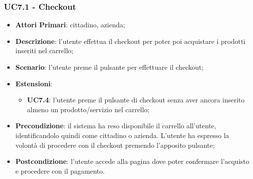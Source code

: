 \subsubsection{UC7.1 - Checkout}
\begin{itemize}
	\item \textbf{Attori Primari}: cittadino, azienda;
	\item \textbf{Descrizione}: l'utente effettua il checkout per poter poi acquistare i prodotti inseriti nel carrello;
	\item \textbf{Scenario}: l'utente preme il pulsante per effettuare il checkout;
	\item \textbf{Estensioni}: 
	\begin{itemize}
		\item \textbf{UC7.4}: l'utente preme il pulsante di checkout senza aver ancora inserito almeno un prodotto/servizio nel carrello;
	\end{itemize}
	\item \textbf{Precondizione}: il sistema ha reso disponibile il carrello all'utente, identificandolo quindi come cittadino o azienda. L'utente ha espresso la volontà di procedere con il checkout premendo l'apposito pulsante;
	\item \textbf{Postcondizione}: l'utente accede alla pagina dove poter confermare l'acquisto e procedere con il pagamento.
\end{itemize}

